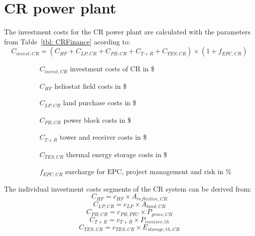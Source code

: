 \section{CR power plant}
The investment costs for the CR power plant are calculated with the parameters from Table~\ref{tbl: CRFinance} acording to:
\begin{equation}
C_{invest,CR} = (C_{HF}+C_{LP,CR}+C_{PB,CR}+C_{T+R}+C_{TES,CR})\times(1+f_{EPC,CR}) \label{GL_CRInvest}
\end{equation} 
\begin{itemize}
\item[ ] 
\begin{itemize}
\item[ ] 
\begin{itemize}
\item[$C_{invest,CR}$]investment costs of CR in \$
\item[$C_{HF}$]heliostat field costs in \$
\item[$C_{LP,CR}$]land purchase costs in \$
\item[$C_{PB,CR}$]power block costs in \$
\item[$C_{T+R}$]tower and receiver costs in \$
\item[$C_{TES,CR}$]thermal energy storage costs in \$
\item[$f_{EPC,CR}$]surcharge for EPC, project management and risk in \%
\end{itemize}
\end{itemize}
\end{itemize}
The individual investment costs segments of the CR system can be derived from:
\begin{equation}
C_{HF} = c_{HF} \times A_{reflective,CR}
\end{equation} 
\begin{equation}
C_{LP,CR} = c_{LP} \times A_{land,CR}
\end{equation} 
\begin{equation}
C_{PB,CR} = c_{PB,PTC} \times P_{gross,CR}
\end{equation} 
\begin{equation}
C_{T+R} = c_{T+R} \times P_{receiver,th}
\end{equation} 
\begin{equation}
C_{TES,CR} = c_{TES,CR} \times E_{storage,th,CR}
\end{equation} 

